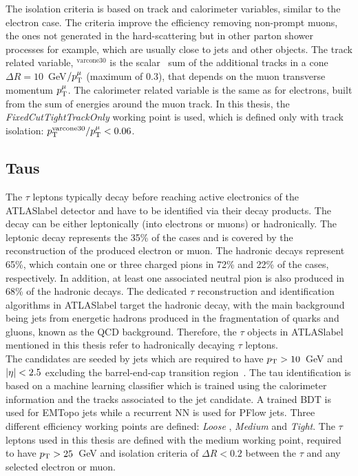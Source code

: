 The isolation criteria is based on track and calorimeter variables, similar to the electron case. The criteria improve the efficiency removing non-prompt muons, the ones not generated in the hard-scattering but in other parton shower processes for example, which are usually close to jets and other objects. The track related variable, \pT$^{\text{varcone30}}$ is the scalar \pT\ sum of the additional tracks in a cone $\Delta R=10$~GeV$/p_{\text{T}}^\mu$ (maximum of 0.3), that depends on the muon transverse momentum $p_{\text{T}}^\mu$. The calorimeter related variable is the same as for electrons, built from the sum of energies around the muon track. In this thesis, the \textit{FixedCutTightTrackOnly} working point is used, which is defined only with track isolation: $p_{\text{T}}^\text{varcone30}/p_{\text{T}}^\mu<0.06$.       

\subsection{Taus}

The $\tau$ leptons typically decay before reaching active electronics of the \acrshort{ATLASlabel} detector and have to be identified via their decay products. The decay can be either leptonically (into electrons or muons) or hadronically. The leptonic decay represents the 35\% of the cases and is covered by the reconstruction of the produced electron or muon. The hadronic decays represent 65\%, which contain one or three charged pions in 72\% and 22\% of the cases, respectively. In addition, at least one associated neutral pion is also produced in 68\% of the hadronic decays. The dedicated $\tau$ reconstruction and identification algorithms in \acrshort{ATLASlabel} target the hadronic decay, with the main background being jets from energetic hadrons produced in the fragmentation of quarks and gluons, known as the \acrshort{QCD} background. Therefore, the $\tau$ objects in \acrshort{ATLASlabel} mentioned in this thesis refer to hadronically decaying $\tau$ leptons. \\

The candidates are seeded by jets which are required to have $p_{\text{T}} > 10$~GeV and $\abs{\eta} < 2.5$ excluding the barrel-end-cap transition region~\cite{ATLAS-CONF-2017-029}. The tau identification is based on a machine learning classifier which is trained using the calorimeter information and the tracks associated to the jet candidate. A trained BDT is used for EMTopo jets while a recurrent NN is used for PFlow jets. Three different efficiency working points are defined: \textit{Loose
}, \textit{Medium} and \textit{Tight}. The $\tau$ leptons used in this thesis are defined with the medium working point, required to have $p_{\text{T}}>25$~GeV and isolation criteria of $\Delta R<0.2$ between the $\tau$ and any selected electron or muon.

